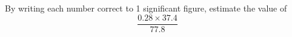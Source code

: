 \question
By writing each number correct to 1 significant figure, estimate the value of\\
$$\frac{0.28 \times 37.4}{77.8}$$
\\ 
\\ 
\\ 
\\
\\
{\flushright{
\hfill          \makebox[12em]{\dotfill}  [2]}}